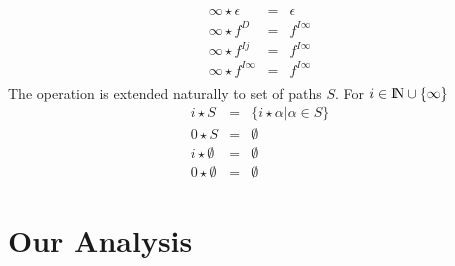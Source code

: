 \documentclass[runningheads,a4paper]{llncs}
\newcommand{\drct}{\ensuremath{D}}
\newcommand{\indrct}{\ensuremath{I}}
\newcommand{\nat}{\ensuremath{\bbbn}}
\begin{document}
\begin{itemize}
{\begin{eqnarray*}
    \infty \star {\epsilon} &=&  \epsilon     \\
    \infty \star {f^{\drct}} &=&    f^{\indrct\infty} \\
    \infty \star {f^{\indrct j}} &=&  {f^{\indrct\infty}} \\
    \infty \star {f^{\indrct\infty}} &=&  {f^{\indrct\infty}} \\
  \end{eqnarray*}
The operation is extended naturally to set of paths $S$. For $i
\in \nat \cup \{\infty\}$
 \begin{eqnarray*}
  i \star {S} &=&   \{ i\star \alpha \vert \alpha \in S\} \\
  0 \star {S} &=&   \emptyset \\
  i \star \emptyset &=&  \emptyset \\ 
  0 \star \emptyset &=&  \emptyset	
  \end{eqnarray*}
}
\end{itemize}
\section{Our Analysis}\label{sec:Analysis_Rules}
\end{document}
